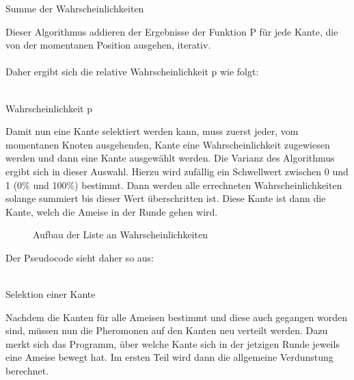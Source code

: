 \documentclass[12pt]{article}
\begin{document}
\begin{algorithm}[H]
\caption{Summe der Wahrscheinlichkeiten}
\DontPrintSemicolon
{}
\end{algorithm}Dieser Algorithmus addieren der Ergebnisse der Funktion P für jede Kante, die von der momentanen Position ausgehen, iterativ.\\\\
Daher ergibt sich die relative Wahrscheinlichkeit p wie folgt:\\\\
\begin{algorithm}[H]
\caption{Wahrscheinlichkeit p}
\DontPrintSemicolon
{}
\end{algorithm}Damit nun eine Kante selektiert werden kann, muss zuerst jeder, vom momentanen Knoten ausgehenden, Kante eine Wahrscheinlichkeit zugewiesen werden und dann eine Kante ausgewählt werden. Die Varianz des Algorithmus ergibt sich in dieser Auswahl. Hierzu wird zufällig ein Schwellwert zwischen 0 und 1 (0\% und 100\%) bestimmt. Dann werden alle errechneten Wahrscheinlichkeiten solange summiert bis dieser Wert überschritten ist. Diese Kante ist dann die Kante, welch die Ameise in der Runde gehen wird.
\begin{figure}[H]
\centering
{}
\caption{Aufbau der Liste an Wahrscheinlichkeiten}
\label{fig:3}
\end{figure}
Der Pseudocode sieht daher so aus:\\\\
\begin{algorithm}[H]
\caption{Selektion einer Kante}
\DontPrintSemicolon
{}
\end{algorithm}Nachdem die Kanten für alle Ameisen bestimmt und diese auch gegangen worden sind, müssen nun die Pheromonen auf den Kanten neu verteilt werden. Dazu merkt sich das Programm, über welche Kante sich in der jetzigen Runde jeweils eine Ameise bewegt hat. Im ersten Teil wird dann die allgemeine Verdunstung berechnet.\\\\
\end{document}
